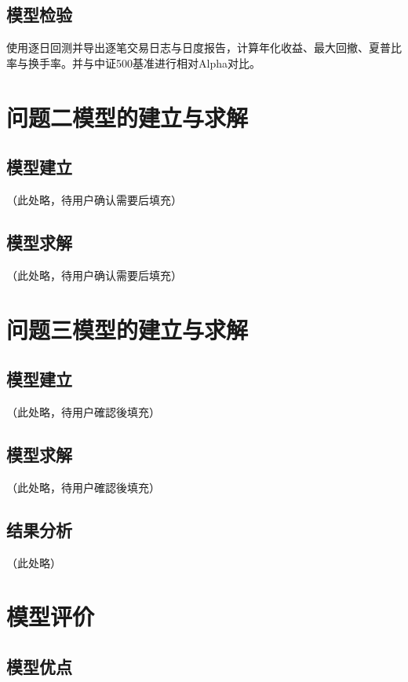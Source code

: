 \documentclass[withoutpreface,bwprint]{cumcmthesis}
\begin{document}
\subsection{模型检验}

使用逐日回测并导出逐笔交易日志与日度报告，计算年化收益、最大回撤、夏普比率与换手率。并与中证500基准进行相对Alpha对比。


\newpage
\section{问题二模型的建立与求解}

\subsection {模型建立}

（此处略，待用户确认需要后填充）

\subsection {模型求解}

（此处略，待用户确认需要后填充）

\section{问题三模型的建立与求解}

\subsection {模型建立}

（此处略，待用户確認後填充）

\subsection {模型求解}

（此处略，待用户確認後填充）

\subsection {结果分析}

（此处略）

\section{模型评价}
\subsection {模型优点}
\end{document}
